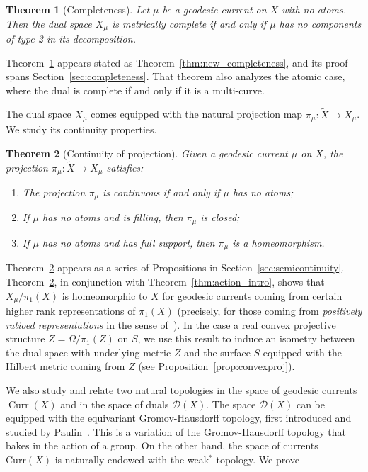 \documentclass[12pt,article]{amsart}
\numberwithin{equation}{section}
\numberwithin{figure}{section}
\newtheorem{mainthm}{Theorem}
\theoremstyle{definition}
\theoremstyle{plain}
\DeclareMathOperator{\Curr}{Curr}
\newcommand*{\wt}[1]{\widetilde{#1}}
\begin{document}
\begin{mainthm}[Completeness]
Let $\mu$ be a geodesic current on $X$ with no atoms. Then the dual space
 $X_{\mu}$ is metrically complete if and only if $\mu$ has no components of type 2 in its decomposition.
 \label{thm:comple_intro}
\end{mainthm}
Theorem~\ref{thm:comple_intro} appears stated as Theorem~\ref{thm:new_completeness}, and its proof spans Section~\ref{sec:completeness}. That theorem also analyzes the atomic case, where the dual is complete if and only if it is a multi-curve. 

The dual space $X_{\mu}$ comes equipped with the natural projection map $\pi_{\mu} \colon \wt{X} \to X_{\mu}$. We study its continuity properties.

\begin{mainthm}[Continuity of projection]
Given a geodesic current $\mu$ on $X$, the projection $\pi_{\mu} \colon \wt{X} \to X_{\mu}$ satisfies:
\begin{enumerate}
\item  The projection $\pi_{\mu}$ is continuous if and only if $\mu$ has no atoms;
\item If $\mu$ has no atoms and is filling, then $\pi_{\mu}$ is closed;
\item If $\mu$ has no atoms and has full support, then $\pi_{\mu}$ is a homeomorphism.
\end{enumerate}
\label{thm:continuity_intro}
\end{mainthm}

Theorem~\ref{thm:continuity_intro} appears as a series of Propositions in Section~\ref{sec:semicontinuity}.
Theorem~\ref{thm:continuity_intro}, in conjunction with Theorem~\ref{thm:action_intro}, shows that $X_{\mu}/\pi_1(X)$ is homeomorphic to $X$
for geodesic currents coming from certain higher rank representations of $\pi_1(X)$ (precisely, for those coming from \emph{positively ratioed representations} in the sense of~\cite{MZ19:PositivelyRatioed}).
In the case a real convex projective structure $Z=\Omega/\pi_1(Z)$ on $S$, we use this result to induce an isometry between the dual space with underlying metric $Z$ and the surface $S$ equipped with the Hilbert metric coming from $Z$ (see Proposition~\ref{prop:convexproj}). 

We also study and relate two natural topologies in the space of geodesic currents $\Curr(X)$ and in the space of duals $\mathcal{D}(X)$. 
The space $\mathcal{D}(X)$ can be equipped with the equivariant Gromov-Hausdorff topology, first introduced and studied by Paulin~\cite{Pau88:Thesis}.
This
is a variation of the Gromov-Hausdorff topology that bakes in the action of a group.
On the other hand, the space of currents $\mathrm{Curr}(X)$ is naturally endowed with the weak$^*$-topology.
We prove 
\end{document}
